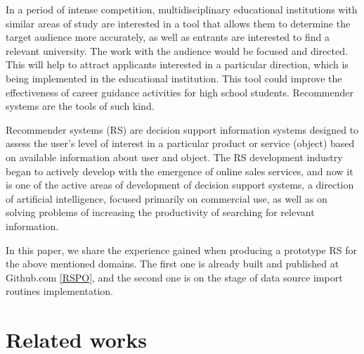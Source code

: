 \documentclass[conference]{IEEEtran}
\begin{document}


In a period of intense competition, multidisciplinary educational institutions with similar areas of study are interested in a tool that allows them to determine the target audience more accurately, as well as entrants are interested to find a relevant university.  The work with the audience would be focused and directed. This will help to attract applicants interested in a particular direction, which is being implemented in the educational institution.  This tool could improve the effectiveness of career guidance activities for high school students.  Recommender systems are the tools of such kind.

Recommender systems (RS) \cite{rs_basics} are decision support information systems designed to assess the user's level of interest in a particular product or service (object) based on available information about user and object.  The RS development industry began to actively develop with the emergence of online sales services, and now it is one of the active areas of development of decision support systems, a direction of artificial intelligence, focused primarily on commercial use, as well as on solving problems of increasing the productivity of searching for relevant information.

In this paper, we share the experience gained when producing a prototype RS for the above mentioned domains.  The first one is already built and published at Github.com \ref{RSPO}, and the second one is on the stage of data source import routines implementation.

\section{Related works}
\end{document}

